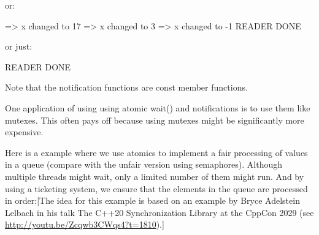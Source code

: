 or:

\begin{shell}
=> x changed to 17
=> x changed to 3
=> x changed to -1
READER DONE
\end{shell}

or just:

\begin{shell}
READER DONE
\end{shell}

Note that the notification functions are const member functions.


One application of using using atomic wait() and notifications is to use them like mutexes. This often pays off because using mutexes might be significantly more expensive.

Here is a example where we use atomics to implement a fair processing of values in a queue (compare with the unfair version using semaphores). Although multiple threads might wait, only a limited number of them might run. And by using a ticketing system, we ensure that the elements in the queue are processed in order:[The idea for this example is based on an example by Bryce Adelstein Lelbach in his talk The C++20 Synchronization Library at the CppCon 2029 (see \url{http://youtu.be/Zcqwb3CWqs4?t=1810}).]


